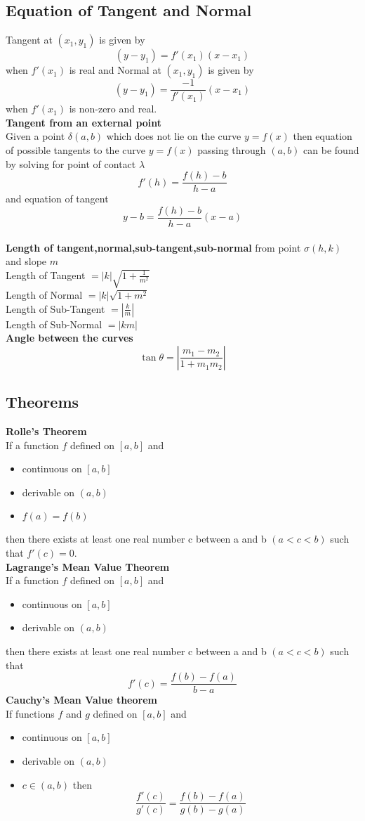 \documentclass[12pt]{article}
\begin{document}
\subsection{Equation of Tangent and Normal}
Tangent at $(x_1,y_1)$ is given by $$(y-y_1)=f'(x_1)(x-x_1)$$ when $f'(x_1)$ is real and Normal at $(x_1,y_1)$ is given by $$(y-y_1)=\frac{-1}{f'(x_1)}(x-x_1)$$ when $f'(x_1)$ is non-zero and real.\\
\textbf{Tangent from an external point} \\
Given a point $\delta(a,b)$ which does not lie on the curve $y=f(x)$
then equation of possible tangents to the curve $y=f(x)$ passing through $(a,b)$ can be found by solving for point of contact $\lambda$
$$f'(h)=\frac{f(h)-b}{h-a}$$ 
and equation of tangent $$ y-b=\frac{f(h)-b}{h-a} (x-a) $$ \\
\textbf{Length of tangent,normal,sub-tangent,sub-normal} from point $\sigma(h,k)$ and slope $m$\\
Length of Tangent $=|k|\sqrt{1+ \frac{1}{m^2}}$ \\
Length of Normal  $=|k|\sqrt{1+ m^2}$ \\
Length of Sub-Tangent $=|\frac{k}{m}|$ \\
Length of Sub-Normal $=|km|$ \\
\textbf{Angle between the curves}
$$\tan \theta=|\frac{m_1-m_2}{1+m_1m_2}|$$
\subsection{Theorems}
\textbf{Rolle's Theorem}\\
If a function $f$ defined on $[a,b]$ and
\begin{itemize} 
\item  continuous on $[a,b]$
\item derivable on $(a,b)$ 
\item $f(a)=f(b)$
\end{itemize}
then there exists at least one real number c between a and b $(a<c<b)$
such that $f'(c)=0.$ \\
\textbf{Lagrange's Mean Value Theorem } \\
If a function $f$ defined on $[a,b]$ and
\begin{itemize} 
\item  continuous on $[a,b]$
\item derivable on $(a,b)$
\end{itemize}
then there exists at least one real number c between a and b $(a<c<b)$
such that $$f'(c)=\frac{f(b)-f(a)}{b-a} $$
\textbf{Cauchy's Mean Value theorem}\\
If functions $f$  and $g$ defined on $[a,b]$ and
\begin{itemize} 
\item  continuous on $[a,b]$
\item derivable on $(a,b)$
\item $c \in (a,b)$ then
$$\frac{f'(c)}{g'(c)}=\frac{f(b)-f(a)}{g(b)-g(a)}$$
\end{itemize}
\end{document}
